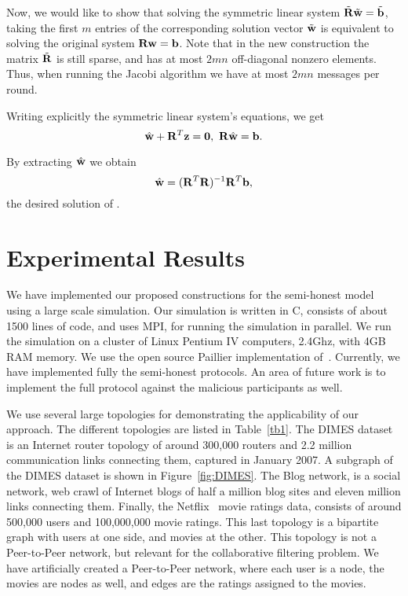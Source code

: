 \documentclass[10pt]{svjour3}
\begin{document}
Now, we would like to show that solving the symmetric linear
system $\tilde{{\bf R}}\tilde{{\bf w}}=\tilde{{\bf b}}$, taking the first $m$
entries of the corresponding solution vector $\tilde{{\bf w}}$ is
equivalent to solving the original system ${\bf R}{\bf w}={\bf b}$. Note that
in the new construction the matrix $\tilde{{\bf R}}$ is still sparse,
and has at most $2mn$ off-diagonal nonzero elements. Thus, when
running the Jacobi algorithm we have at most $2mn$ messages per
round.

Writing explicitly the symmetric linear system's equations, we get
\[ \hat{{\bf w}}+{\bf R}^T{\bf z}=\mathbf{0},\mbox{  }\\
    {\bf R}\hat{{\bf w}}={\bf b}.
    \]

By extracting $\hat{{\bf w}}$ we obtain \[
\hat{{\bf w}}=({\bf R}^{T}{\bf R})^{-1}{\bf R}^{T}{\bf b}, \] the desired solution of
.

\section{Experimental Results}
\label{exp} We have implemented our proposed constructions
for the semi-honest model using a
large scale simulation. Our simulation is written in C, consists
of about 1500 lines of code, and uses MPI, for running the
simulation in parallel. We run the simulation on a cluster of
Linux Pentium IV computers, 2.4Ghz, with 4GB RAM memory. We use
the open source Paillier implementation of~\cite{PaillierIMP}.
Currently, we have implemented fully the semi-honest protocols.
An area of future work is to implement the full protocol against
the malicious participants as well.

We use several large topologies for demonstrating the
applicability of our approach. The different topologies are listed
in Table~\ref{tb1}. The DIMES dataset \cite{DIMES} is an Internet
router topology of around 300,000 routers and 2.2 million
communication links connecting them, captured in January 2007. A
subgraph of the DIMES dataset is shown in Figure~\ref{fig:DIMES}.
The Blog network, is a social network, web crawl of Internet blogs
of half a million blog sites and eleven million links connecting
them. Finally, the Netflix~\cite{Netflix} movie ratings data,
consists of around 500,000 users and 100,000,000 movie ratings.
This last topology is a bipartite graph with users at one side,
and movies at the other. This topology is not a Peer-to-Peer
network, but relevant for the collaborative filtering problem. We
have artificially created a Peer-to-Peer network, where each user
is a node, the movies are nodes as well, and edges are the ratings
assigned to the movies.
\end{document}
